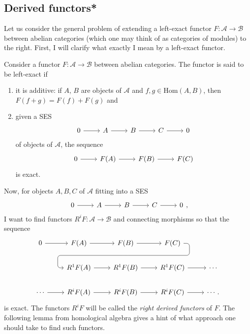 \subsection{Derived functors*}
Let us consider the general problem of extending a left-exact
functor $F:\mathcal{A}\to\mathcal{B}$ between abelian categories
(which one may think of as categories of modules) to the right.
First, I will clarify what exactly I mean by a left-exact functor.
\begin{defin}
  Consider a functor $F:\mathcal{A}\to\mathcal{B}$ between abelian
  categories. The functor is said to be left-exact if
  \begin{enumerate}
    \item it is additive: if $A$, $B$ are objects of $\mathcal{A}$
          and $f, g\in\text{Hom}(A, B)$, then $F(f+g)=F(f)+F(g)$ and
    \item given a SES
          \[\begin{tikzcd}
              0\rar & A\rar & B\rar & C\rar & 0
            \end{tikzcd}\]
          of objects of $\mathcal{A}$, the sequence
          \[\begin{tikzcd}
              0\rar & F(A)\rar & F(B)\rar & F(C)
            \end{tikzcd}\]
          is exact.
  \end{enumerate}
\end{defin}
Now, for objects $A,B,C$ of $\mathcal{A}$ fitting into a SES
\[\begin{tikzcd}
    0\rar & A\rar & B\rar & C\rar & 0
  \end{tikzcd},\]
I want to find functors $R^{i}F:\mathcal{A}\to\mathcal{B}$ and
connecting morphisms so that the sequence
\[
\begin{tikzcd}
  0 \rar & F(A) \rar & F(B)
  \rar\dar[phantom, ""{coordinate, name=Z}] & F(C)
  \arrow[rounded corners, to path={ -- ([xshift=2ex]\tikztostart.east)
    |- (Z) -| ([xshift=-2ex]\tikztotarget.west) -- (\tikztotarget)},
  overlay]{dll} & \\
  & R^{1}F(A)\rar & R^{1}F(B)\rar
  & R^{1}F(C)\rar & \cdots \\
  \cdots\rar & R^{i}F(A)\rar & R^{i}F(B)\rar
  & R^{i}F(C)\rar & \cdots.
\end{tikzcd}
\]
is exact. The functors $R^{i}F$ will be called the \emph{right
  derived functors} of $F$. The following lemma from homological
algebra gives a hint of what approach one should take to find such functors.
